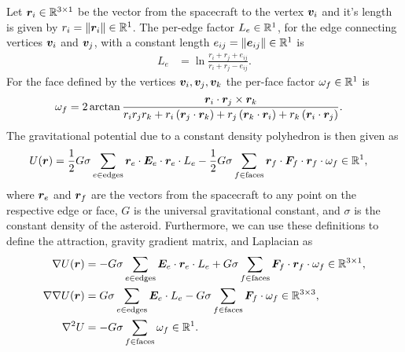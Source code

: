 Let \( \bm{r}_i \in \mathbb{R}^{3 \times 1} \) be the vector from the spacecraft to the vertex \( \bm{v}_i \) and it's length is given by \( r_i = \left\| \bm{r}_i \right\| \in \mathbb{R}^{1} \).
The per-edge factor \( L_e \in \mathbb{R}^{1}\), for the edge connecting vertices \( \bm{v}_i \) and \( \bm{v}_j \), with a constant length \( e_{ij} = \left\| \bm{e}_{ij} \right\| \in \mathbb{R}^1\) is
\begin{align}\label{eq:edge_factor}
    L_e &= \ln \frac{r_i + r_j + e_{ij}}{r_i + r_j - e_{ij}}.
\end{align}
For the face defined by the vertices \( \bm{v}_i, \bm{v}_j, \bm{v}_k \) the per-face factor \( \omega_f \in \mathbb{R}^{1} \) is
\begin{align}\label{eq:face_factor}
    \omega_f &= 2 \arctan \frac{\bm{r}_i \cdot \bm{r}_j \times \bm{r}_k}{r_i r_j r_k + r_i \left( \bm{r}_j \cdot \bm{r}_k \right) + r_j \left( \bm{r}_k \cdot \bm{r}_i \right) + r_k \left( \bm{r}_i \cdot \bm{r}_j \right)}.
\end{align}
The gravitational potential due to a constant density polyhedron is then given as
\begin{align}\label{eq:potential}
    U(\bm{r}) &= \frac{1}{2} G \sigma \sum_{e \in \text{edges}} \bm{r}_e \cdot \bm{E}_e \cdot \bm{r}_e \cdot L_e - \frac{1}{2}G \sigma \sum_{f \in \text{faces}} \bm{r}_f \cdot \bm{F}_f \cdot \bm{r}_f \cdot \omega_f \in \mathbb{R}^1,
\end{align}
where \( \bm{r}_e\) and \(\bm{r}_f \) are the vectors from the spacecraft to any point on the respective edge or face, \( G\) is the universal gravitational constant, and \( \sigma \) is the constant density of the asteroid.
Furthermore, we can use these definitions to define the attraction, gravity gradient matrix, and Laplacian as
\begin{align}
    \nabla U ( \bm{r} ) &= -G \sigma \sum_{e \in \text{edges}} \bm{E}_e \cdot \bm{r}_e \cdot L_e + G \sigma \sum_{f \in \text{faces}} \bm{F}_f \cdot \bm{r}_f \cdot \omega_f \in \mathbb{R}^{3 \times 1} , \label{eq:attraction}\\
    \nabla \nabla U ( \bm{r} ) &= G \sigma \sum_{e \in \text{edges}} \bm{E}_e  \cdot L_e - G \sigma \sum_{f \in \text{faces}} \bm{F}_f \cdot \omega_f \in \mathbb{R}^{3 \times 3}, \label{eq:gradient_matrix}\\
    \nabla^2 U &= -G \sigma \sum_{f \in \text{faces}}  \omega_f \in \mathbb{R}^1.\label{eq:laplacian}
\end{align}

